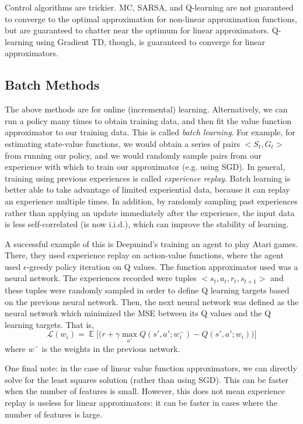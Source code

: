\documentclass{article}
\DeclareMathOperator{\EX}{\mathbb{E}}
\newcommand{\ita}{\textit}
\newcommand{\eps}{\epsilon}
\begin{document}
Control algorithms are trickier. MC, SARSA, and Q-learning are not guaranteed to converge to the optimal approximation for non-linear approximation functions, but are guaranteed to chatter near the optimum for linear approximators. Q-learning using Gradient TD, though, is guaranteed to converge for linear approximators.

\subsection{Batch Methods}

The above methods are for online (incremental) learning. Alternatively, we can run a policy many times to obtain training data, and then fit the value function approximator to our training data. This is called \ita{batch learning}. For example, for estimating state-value functions, we would obtain a series of pairs $<S_t, G_t>$ from running our policy, and we would randomly sample pairs from our experience with which to train our approximator (e.g. using SGD). In general, training using previous experiences is called \ita{experience replay}. Batch learning is better able to take advantage of limited experiential data, because it can replay an experience multiple times. In addition, by randomly sampling past experiences rather than applying an update immediately after the experience, the input data is less self-correlated (is now i.i.d.), which can improve the stability of learning.

A successful example of this is Deepmind's training an agent to play Atari games. There, they used experience replay on action-value functions, where the agent used $\eps$-greedy policy iteration on Q values. The function approximator used was a neural network. The experiences recorded were tuples $<s_t, a_t, r_t, s_{t+1}>$ and these tuples were randomly sampled in order to define Q learning targets based on the previous neural network. Then, the next neural network was defined as the neural network which minimized the MSE between its Q values and the Q learning targets. That is,
\begin{equation}\label{eq:atari_neuralnet_loss_function}
\mathcal{L}(w_i) = \EX\bigg[\big(r+\gamma\max_{a'}Q(s', a'; w^-_i) - Q(s', a'; w_i)\big)\bigg]
\end{equation}
where $w^-$ is the weights in the previous network.

One final note: in the case of linear value function approximators, we can directly solve for the least squares solution (rather than using SGD). This can be faster when the number of features is small. However, this does not mean experience replay is useless for linear approximators: it can be faster in cases where the number of features is large.
\end{document}
